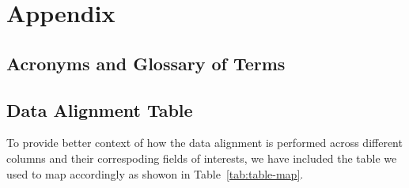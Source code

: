 \section{Appendix}
\subsection{Acronyms and Glossary of Terms}

\printglossary[type=\acronymtype, title=Acronyms]
\printglossary[title=Glossary of Terms]

\subsection{Data Alignment Table}\label{sec:alignment}
To provide better context of how the data alignment is performed across different columns and their correspoding fields of interests, we have included the table we used to map accordingly as showon in Table~\ref{tab:table-map}.

